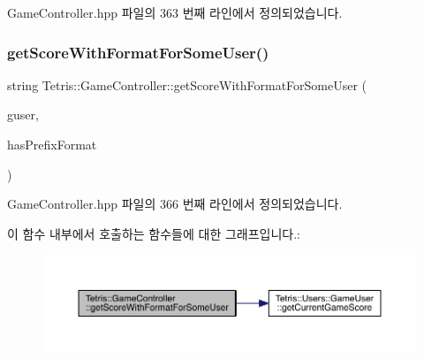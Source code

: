 Game\+Controller.\+hpp 파일의 363 번째 라인에서 정의되었습니다.

\mbox{\label{class_tetris_1_1_game_controller_ab9ee25a033698516dd98c254ab8f8f1b}} 
\subsubsection{\texorpdfstring{get\+Score\+With\+Format\+For\+Some\+User()}{getScoreWithFormatForSomeUser()}}
{\footnotesize\ttfamily string Tetris\+::\+Game\+Controller\+::get\+Score\+With\+Format\+For\+Some\+User (\begin{DoxyParamCaption}\item[{\hyperlink{class_tetris_1_1_users_1_1_game_user}{Game\+User} $\ast$}]{guser,  }\item[{bool}]{has\+Prefix\+Format }\end{DoxyParamCaption})\hspace{0.3cm}{\ttfamily [inline]}}



Game\+Controller.\+hpp 파일의 366 번째 라인에서 정의되었습니다.

이 함수 내부에서 호출하는 함수들에 대한 그래프입니다.\+:
\nopagebreak
\begin{figure}[H]
\begin{center}
\leavevmode
\includegraphics[width=350pt]{class_tetris_1_1_game_controller_ab9ee25a033698516dd98c254ab8f8f1b_cgraph}
\end{center}
\end{figure}
\mbox{\label{class_tetris_1_1_game_controller_aa3c2d1f1b5539576116833526478355a}} 
